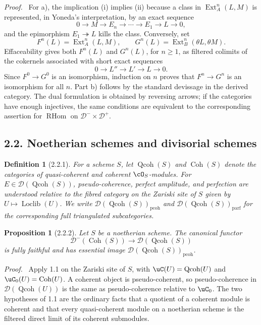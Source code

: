 \documentclass[11pt]{article}
\theoremstyle{plain}
\newtheorem*{proposition*}{Proposition}
\newtheorem*{definition*}{Definition}
\theoremstyle{definition}
\theoremstyle{remark}
\newenvironment{prooftext}{\par\noindent\textit{Proof.}\ }{\par\medskip}
\newcommand{\D}{\mathcal D}\newcommand{\E}{\mathcal E}\newcommand{\F}{\mathcal F}
\DeclareMathOperator{\Ext}{Ext}
\DeclareMathOperator{\RHom}{RHom}
\providecommand{\Qcoh}{\operatorname{Qcoh}}
\providecommand{\Coh}{\operatorname{Coh}}
\providecommand{\Loclib}{\operatorname{Loclib}}
\begin{document}
\begin{prooftext}
For a), the implication (i) implies (ii) because a class in $\Ext_A^n(L,M)$ is represented, in Yoneda's interpretation, by an exact sequence
\[
0\to M\to E_n\to\cdots\to E_1\to L\to0,
\]
and the epimorphism $E_1\twoheadrightarrow L$ kills the class. Conversely, set
\[
F^n(L)=\Ext_A^n(L,M),\qquad G^n(L)=\Ext_B^n(\theta L,\theta M).
\]
Effaceability gives both $F^n(L)$ and $G^n(L)$, for $n\ge1$, as filtered colimits of the cokernels associated with short exact sequences
\[
0\to L''\to L'\to L\to0.
\]
Since $F^0\to G^0$ is an isomorphism, induction on $n$ proves that $F^n\to G^n$ is an isomorphism for all $n$. Part b) follows by the standard devissage in the derived category. The dual formulation is obtained by reversing arrows; if the categories have enough injectives, the same conditions are equivalent to the corresponding assertion for $\RHom$ on $\D^-\times\D^+$.
\end{prooftext}

\subsection*{2.2. Noetherian schemes and divisorial schemes}
\begin{definition*}[2.2.1]
For a scheme $S$, let $\Qcoh(S)$ and $\Coh(S)$ denote the categories of quasi-coherent and coherent $\cO_S$-modules. For $E\in\D(\Qcoh(S))$, pseudo-coherence, perfect amplitude, and perfection are understood relative to the fibred category on the Zariski site of $S$ given by $U\mapsto\Loclib(U)$. We write $\D(\Qcoh(S))_{\mathrm{pcoh}}$ and $\D(\Qcoh(S))_{\mathrm{parf}}$ for the corresponding full triangulated subcategories.
\end{definition*}

\begin{proposition*}[2.2.2]
Let $S$ be a noetherian scheme. The canonical functor
\[
\D^-(\Coh(S))\longrightarrow \D(\Qcoh(S))
\]
is fully faithful and has essential image $\D(\Qcoh(S))_{\mathrm{pcoh}}$.
\end{proposition*}

\begin{prooftext}
Apply 1.1 on the Zariski site of $S$, with $\uC(U)=\Qcoh(U)$ and $\uC_0(U)=\Coh(U)$. A coherent object is pseudo-coherent, so pseudo-coherence in $\D(\Qcoh(U))$ is the same as pseudo-coherence relative to $\uC_0$. The two hypotheses of 1.1 are the ordinary facts that a quotient of a coherent module is coherent and that every quasi-coherent module on a noetherian scheme is the filtered direct limit of its coherent submodules.
\end{prooftext}
\end{document}
